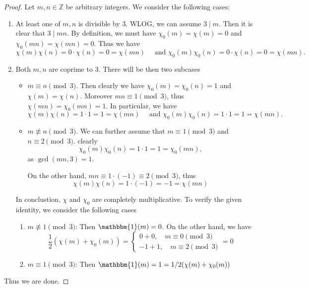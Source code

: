 \documentclass[11pt,letterpaper]{article}
\DeclareMathOperator{\1}{\mathbbm{1}}
\begin{document}
\begin{proof}
  \hfill

  Let $m,n \in \mathbb{Z}$ be arbitrary integers. We consider the following cases:
  \begin{enumerate}
    \item At least one of $m,n$ is divisible by $3$. WLOG, we can assume $3 \mid m$. Then it is clear that $3 \mid mn$.
          By definition, we must have $\chi_0(m) = \chi(m) =0$ and $\chi_0(mn) =\chi(mn)=0$. Thus we have
          \[\chi(m)\chi(n) = 0\cdot \chi(n) = 0 = \chi(mn) \quad \text{ and }\chi_0(m)\chi_0(n) = 0\cdot \chi(n) = 0 = \chi(mn).\]
    \item Both $m,n$ are coprime to $3$. There will be then two subcases
          \begin{itemize}
            \item $m \equiv n \pmod 3$. Then clearly we have $\chi_0(m) = \chi_0(n)=1$ and $\chi(m)=\chi(n)$. Moreover
                  $mn \equiv 1 \pmod 3$, thus $\chi(mn)=\chi_0(mn)=1$. In particular, we have
                  \[\chi(m)\chi(n) = 1\cdot 1 = 1 = \chi(mn) \quad \text{ and }\chi_0(m)\chi_0(n) = 1\cdot 1 = 1 = \chi(mn).\]
            \item $m \not\equiv n \pmod 3$. We can further assume that $ m \equiv 1 \pmod 3$ and $n \equiv 2 \pmod 3$. clearly
                  \[\chi_0(m)\chi_0(n) = 1\cdot 1 = 1 = \chi_0(mn), \]
                  as $\gcd(mn,3)=1$.

                  On the other hand, $mn \equiv 1 \cdot (-1)\equiv 2 \pmod 3$, thus
                  \[\chi(m)\chi(n) = 1\cdot (-1) = -1 = \chi(mn) \]
          \end{itemize}
          In conclustion, $\chi$ and $\chi_0$ are completely multiplicative. To verify the given identity, we consider
          the following cases
          \begin{enumerate}
            \item $m \not\equiv 1 \pmod 3$: Then $\mathbbm{1}(m) = 0$. On the other hand, we have
                  \[\dfrac{1}{2}\left(\chi(m)+\chi_0(m)\right)= \begin{cases}
                      0+0, \quad m \equiv 0 \pmod 3 \\
                      -1+1, \quad m \equiv 2 \pmod 3
                    \end{cases} = 0\]
            \item $m \equiv 1 \pmod 3$: Then $\mathbbm{1}(m) =1 =1/2(\chi(m)+\chi_0(m))$
          \end{enumerate}
  \end{enumerate}
  Thus we are done.
\end{proof}
\end{document}
